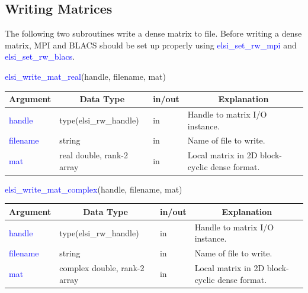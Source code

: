 \documentclass{report}
\newcommand{\tcb}[1]{\textcolor{blue}{#1}}
\begin{document}
\subsection{Writing Matrices}
\label{subsec:rw_write}
The following two subroutines write a dense matrix to file. Before writing a dense matrix, MPI and BLACS should be set up properly using \tcb{elsi\_set\_rw\_mpi} and \tcb{elsi\_set\_rw\_blacs}.
\begin{labeling}{\hspace{6cm}}
\item [\hspace{0.3cm} \tcb{elsi\_write\_mat\_real}(handle, filename, mat)]
\end{labeling}

\begin{tabular}[]{|p{20mm}|p{45mm}|p{15mm}|p{85mm}|}
\hline
\multicolumn{1}{|c|}{\textbf{Argument}} & \multicolumn{1}{c|}{\textbf{Data Type}} & \multicolumn{1}{c|}{\textbf{in/out}} & \multicolumn{1}{c|}{\textbf{Explanation}}\\
\hline
\tcb{handle}   & type(elsi\_rw\_handle)    & in & Handle to matrix I/O instance.\\
\hline
\tcb{filename} & string                    & in & Name of file to write.\\
\hline
\tcb{mat}      & real double, rank-2 array & in & Local matrix in 2D block-cyclic dense format.\\
\hline
\end{tabular}

\begin{labeling}{\hspace{6cm}}
\item [\hspace{0.3cm} \tcb{elsi\_write\_mat\_complex}(handle, filename, mat)]
\end{labeling}

\begin{tabular}[]{|p{20mm}|p{45mm}|p{15mm}|p{85mm}|}
\hline
\multicolumn{1}{|c|}{\textbf{Argument}} & \multicolumn{1}{c|}{\textbf{Data Type}} & \multicolumn{1}{c|}{\textbf{in/out}} & \multicolumn{1}{c|}{\textbf{Explanation}}\\
\hline
\tcb{handle}   & type(elsi\_rw\_handle)       & in & Handle to matrix I/O instance.\\
\hline
\tcb{filename} & string                       & in & Name of file to write.\\
\hline
\tcb{mat}      & complex double, rank-2 array & in & Local matrix in 2D block-cyclic dense format.\\
\hline
\end{tabular}
\end{document}
